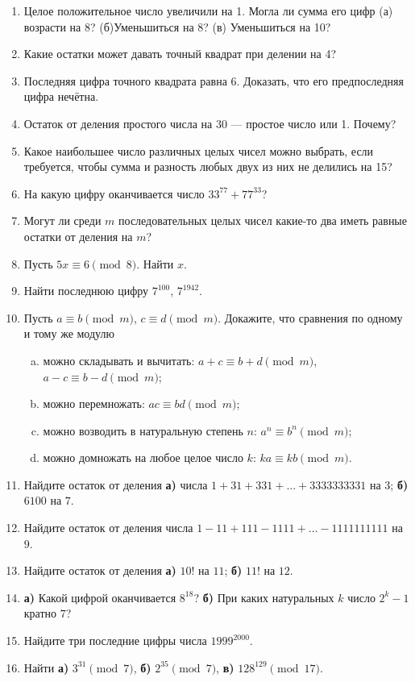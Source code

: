 \begin{enumerate}
\item Целое положительное число увеличили на 1. Могла ли сумма
его цифр (а) возрасти на 8? (б)Уменьшиться на 8? (в) Уменьшиться
на 10?
\item Какие остатки может давать точный квадрат при делении на 4?
\item Последняя цифра точного квадрата равна 6. Доказать, что его
предпоследняя цифра нечётна.
\item Остаток от деления простого числа на 30 --- простое число или 1. Почему?
\item Какое наибольшее число различных целых чисел можно выбрать, если требуется, чтобы сумма и разность любых двух из них не делились на 15?
\item На какую цифру оканчивается число $33^{77}+77^{33}$?
\item Могут ли среди $m$ последовательных целых чисел какие-то два иметь равные остатки от
деления на $m$?
\item Пусть $5x\equiv 6\pmod 8$. Найти $x$.
\item Найти последнюю цифру $7^{100}$, $7^{1942}$.
\item Пусть $a \equiv b \pmod m$, $c \equiv d \pmod m$. Докажите, что сравнения по одному и тому же модулю
\begin{enumerate}[a)]
\item можно складывать и вычитать: $a + c \equiv b + d \pmod m$, $a - c \equiv b - d \pmod m$;
\item можно перемножать: $ac \equiv bd \pmod m$;
\item можно возводить в натуральную степень $n$: $a^n \equiv b^n \pmod m$;
\item можно домножать на любое целое число $k$: $ka \equiv kb \pmod m$.
\end{enumerate}
\item Найдите остаток от деления \textbf{а)} числа $1 + 31 + 331 + \dots + 3333333331$ на $3$; \textbf{б)} $6100$ на $7$.
\item Найдите остаток от деления числа $1 - 11 + 111 - 1111 + \dots - 1111111111$ на $9$.
\item Найдите остаток от деления \textbf{а)} $10!$ на $11$; \textbf{б)} $11!$ на $12$.
\item \textbf{а)} Какой цифрой оканчивается $8^{18}$? \textbf{б)} При каких натуральных $k$ число $2^k-1$ кратно $7$?
\item Найдите три последние цифры числа $1999^{2000}$.
\item Найти \textbf{а)} $3^{31}\pmod 7$, \textbf{б)} $2^{35}\pmod 7$, \textbf{в)} $128^{129}\pmod {17}$.

\end{enumerate}
